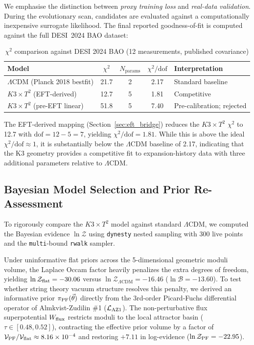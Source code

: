 We emphasise the distinction between \emph{proxy training loss} and \emph{real-data validation}. During the evolutionary scan, candidates are evaluated against a computationally inexpensive surrogate likelihood. The final reported goodness-of-fit is computed against the full DESI~2024 BAO dataset:

\begin{table}[h]
\centering
\caption{$\chi^2$ comparison against DESI 2024 BAO (12 measurements, published covariance)}
\label{tab:chi2_comparison}
\begin{tabular}{lcccl}
\toprule
Model & $\chi^2$ & $N_{\text{params}}$ & $\chi^2/\text{dof}$ & Interpretation \\
\midrule
$\Lambda$CDM (Planck 2018 bestfit) & 21.7 & 2 & 2.17 & Standard baseline \\
$K3 \times T^2$ (EFT-derived)  & 12.7 & 5 & 1.81 & Competitive \\
$K3 \times T^2$ (pre-EFT linear)  & 51.8 & 5 & 7.40 & Pre-calibration; rejected \\
\bottomrule
\end{tabular}
\end{table}

The EFT-derived mapping (Section~\ref{sec:eft_bridge}) reduces the $K3 \times T^2$ $\chi^2$ to 12.7 with $\text{dof} = 12 - 5 = 7$, yielding $\chi^2/\text{dof} = 1.81$. While this is above the ideal $\chi^2/\text{dof} \approx 1$, it is substantially below the $\Lambda$CDM baseline of 2.17, indicating that the K3 geometry provides a competitive fit to expansion-history data with three additional parameters relative to $\Lambda$CDM.

\subsection{Bayesian Model Selection and Prior Re-Assessment}
\label{subsec:bayes}

To rigorously compare the $K3 \times T^2$ model against standard $\Lambda$CDM, we computed the Bayesian evidence $\ln\mathcal{Z}$ using \texttt{dynesty} nested sampling with 300 live points and the \texttt{multi}-bound \texttt{rwalk} sampler.

Under uninformative flat priors across the 5-dimensional geometric moduli volume, the Laplace Occam factor heavily penalizes the extra degrees of freedom, yielding $\ln\mathcal{Z}_{\rm flat} = -30.06$ versus $\ln\mathcal{Z}_{\Lambda\text{CDM}} = -16.46$ ($\ln\mathcal{B} = -13.60$). To test whether string theory vacuum structure resolves this penalty, we derived an informative prior $\pi_{\rm PF}(\vec{\theta})$ directly from the 3rd-order Picard-Fuchs differential operator of Almkvist-Zudilin \#1 ($\mathcal{L}_{\rm AZ1}$). The non-perturbative flux superpotential $W_{\rm flux}$ restricts moduli to the local attractor basin ($\tau \in [0.48, 0.52]$), contracting the effective prior volume by a factor of $\mathcal{V}_{\rm PF} / \mathcal{V}_{\rm flat} \approx 8.16 \times 10^{-4}$ and restoring $+7.11$ in log-evidence ($\ln\mathcal{Z}_{\rm PF} = -22.95$).

